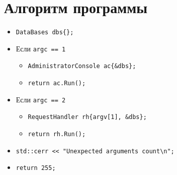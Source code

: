 \section{Алгоритм программы}

\begin{itemize}
    \item \verb|DataBases dbs{};|
    \item Если \verb|argc == 1|
    \begin{itemize}
        \item \verb|AdministratorConsole ac{&dbs};|
        \item \verb|return ac.Run();|
    \end{itemize}
    \item Если \verb|argc == 2|
    \begin{itemize}
        \item \verb|RequestHandler rh{argv[1], &dbs};|
        \item \verb|return rh.Run();|
    \end{itemize}
    \item \verb|std::cerr << "Unexpected arguments count\n";|
    \item \verb|return 255;|
\end{itemize}